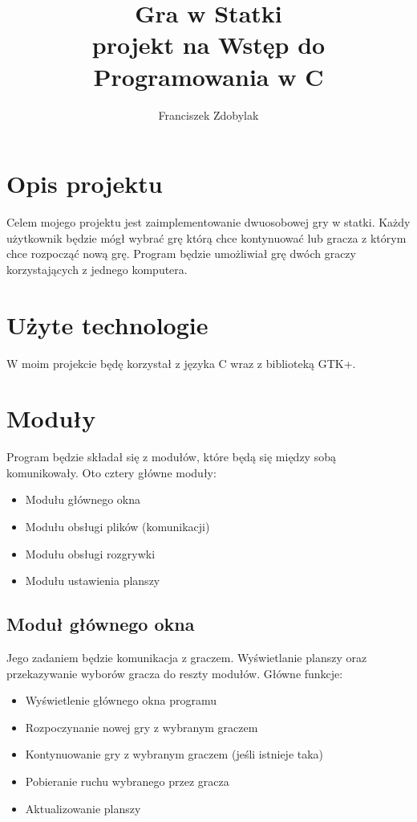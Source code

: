 \documentclass[a4paper]{article}
\author{Franciszek Zdobylak}
\title{\Huge{\bf{Gra w Statki}}\\
				\small projekt na Wstęp do Programowania w C}
\begin{document}
\maketitle

\section{Opis projektu}

Celem mojego projektu jest zaimplementowanie dwuosobowej gry w statki. Każdy użytkownik będzie mógł wybrać grę którą chce kontynuować lub gracza z którym chce rozpocząć nową grę.
Program będzie umożliwiał grę dwóch graczy korzystających z jednego komputera.

\section{Użyte technologie}
W moim projekcie będę korzystał z języka C wraz z biblioteką GTK+.

\section{Moduły}
Program będzie składał się z modułów, które będą się między sobą komunikowały. Oto cztery główne moduły:
\begin{itemize}
	\item Modułu głównego okna
	\item Modułu obsługi plików (komunikacji)
	\item Modułu obsługi rozgrywki
	\item Modułu ustawienia planszy
\end{itemize}

\subsection{Moduł głównego okna}
Jego zadaniem będzie komunikacja z graczem. Wyświetlanie planszy oraz przekazywanie wyborów gracza do reszty modułów.
Główne funkcje:
\begin{itemize}
	\item Wyświetlenie głównego okna programu
	\item Rozpoczynanie nowej gry z wybranym graczem
	\item Kontynuowanie gry z wybranym graczem (jeśli istnieje taka)
	\item Pobieranie ruchu wybranego przez gracza
	\item Aktualizowanie planszy
\end{itemize}
\end{document}
